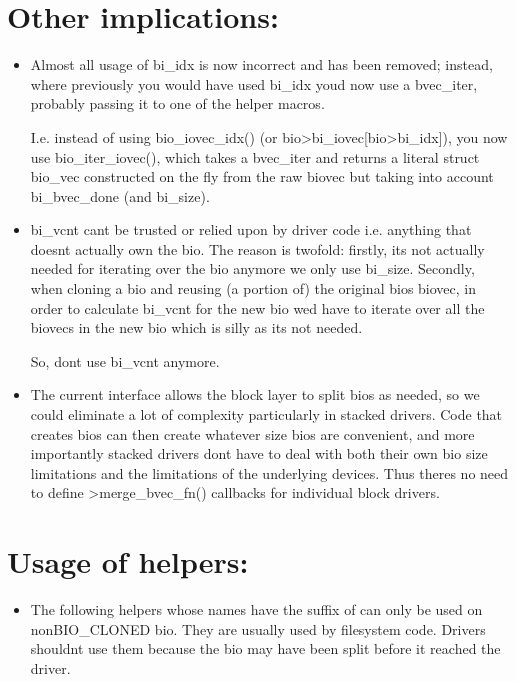 \documentclass[a4paper,11pt,english]{sphinxmanual}
\begin{document}
\section{Other implications:}
\label{\detokenize{biovecs:other-implications}}\begin{itemize}
\item {} 
Almost all usage of bi\_idx is now incorrect and has been removed; instead,
where previously you would have used bi\_idx you\textquotesingle{}d now use a bvec\_iter,
probably passing it to one of the helper macros.

I.e. instead of using bio\_iovec\_idx() (or bio\sphinxhyphen{}\textgreater{}bi\_iovec{[}bio\sphinxhyphen{}\textgreater{}bi\_idx{]}), you
now use bio\_iter\_iovec(), which takes a bvec\_iter and returns a
literal struct bio\_vec \sphinxhyphen{} constructed on the fly from the raw biovec but
taking into account bi\_bvec\_done (and bi\_size).

\item {} 
bi\_vcnt can\textquotesingle{}t be trusted or relied upon by driver code \sphinxhyphen{} i.e. anything that
doesn\textquotesingle{}t actually own the bio. The reason is twofold: firstly, it\textquotesingle{}s not
actually needed for iterating over the bio anymore \sphinxhyphen{} we only use bi\_size.
Secondly, when cloning a bio and reusing (a portion of) the original bio\textquotesingle{}s
biovec, in order to calculate bi\_vcnt for the new bio we\textquotesingle{}d have to iterate
over all the biovecs in the new bio \sphinxhyphen{} which is silly as it\textquotesingle{}s not needed.

So, don\textquotesingle{}t use bi\_vcnt anymore.

\item {} 
The current interface allows the block layer to split bios as needed, so we
could eliminate a lot of complexity particularly in stacked drivers. Code
that creates bios can then create whatever size bios are convenient, and
more importantly stacked drivers don\textquotesingle{}t have to deal with both their own bio
size limitations and the limitations of the underlying devices. Thus
there\textquotesingle{}s no need to define \sphinxhyphen{}\textgreater{}merge\_bvec\_fn() callbacks for individual block
drivers.

\end{itemize}


\section{Usage of helpers:}
\label{\detokenize{biovecs:usage-of-helpers}}\begin{itemize}
\item {} 
The following helpers whose names have the suffix of  can only be used
on non\sphinxhyphen{}BIO\_CLONED bio. They are usually used by filesystem code. Drivers
shouldn\textquotesingle{}t use them because the bio may have been split before it reached the
driver.

\end{itemize}
\end{document}

